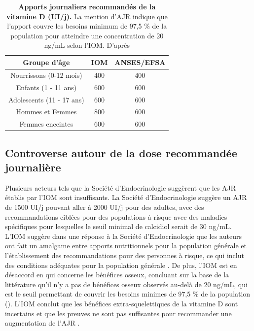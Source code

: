 \documentclass[
  a4paper,
  DIV=11,
  numbers=noendperiod,
  listof=totoc]{scrreprt}
\begin{document}
\begin{table}
\centering
\caption[Apports journaliers recommandés de la vitamine D (UI/j)]{\textbf{Apports journaliers recommandés de la vitamine D (UI/j).} La mention d'\ac{AJR} indique que l'apport couvre les besoins minimum de 97,5 \% de la population pour atteindre une concentration de 20 ng/mL selon l'\ac{IOM}. D'après \textcite{ANSES.2021, IOM.2011}}
\label{tbl-AJR}
\begin{tabular}{ccc}
\toprule
\textbf{Groupe d'âge} & \textbf{IOM} & \textbf{ANSES/EFSA} \\
\midrule
Nourrissons (0-12 mois) & 400 & 400 \\
Enfants (1 - 11 ans) & 600 & 600 \\
Adolescents (11 - 17 ans) & 600 & 600 \\
Hommes et Femmes & 800 & 600 \\
Femmes enceintes & 600 & 600 \\
\bottomrule
\end{tabular}
\end{table}

\subsection{Controverse autour de la dose recommandée
journalière}\label{controverse-autour-de-la-dose-recommanduxe9e-journaliuxe8re}

Plusieurs acteurs tels que la Société d'Endocrinologie suggèrent que les
\ac{AJR} établis par l'\ac{IOM} sont insuffisants. La Société
d'Endocrinologie suggère un \ac{AJR} de 1500 UI/j pouvant aller à 2000
UI/j pour des adultes, avec des recommandations ciblées pour des
populations à risque avec des maladies spécifiques pour lesquelles le
seuil minimal de calcidiol serait de 30 ng/mL. L'\ac{IOM} suggère dans
une réponse à la Société d'Endocrinologie que les auteurs ont fait un
amalgame entre apports nutritionnels pour la population générale et
l'établissement des recommandations pour des personnes à risque, ce qui
inclut des conditions adéquates pour la population générale
\autocite{Rosen.IOM.2012}. De plus, l'\ac{IOM} est en désaccord en qui
concerne les bénéfices osseux, concluant sur la base de la littérature
qu'il n'y a pas de bénéfices osseux observés au-delà de 20 ng/mL, qui
est le seuil permettant de couvrir les besoins minimes de 97,5 \% de la
population (). L'\ac{IOM} conclut que les bénéfices
extra-squelettiques de la vitamine D sont incertains et que les preuves
ne sont pas suffisantes pour recommander une augmentation de l'\ac{AJR}
\autocite{IOM.2011}.
\end{document}
